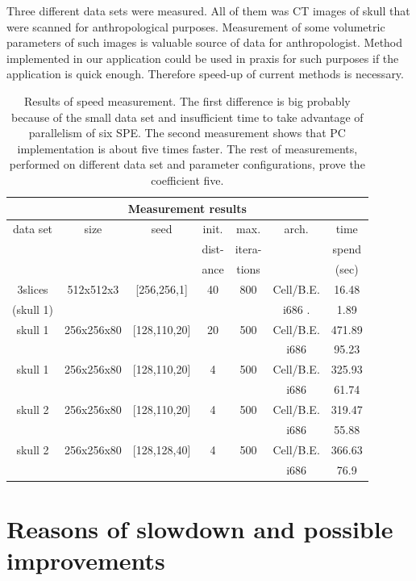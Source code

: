 Three different data sets were measured.
All of them was CT images of skull that were scanned for anthropological purposes.
Measurement of some volumetric parameters of such images is valuable source of data for anthropologist.
Method implemented in our application could be used in praxis for such purposes if the application is quick enough.
Therefore speed-up of current methods is necessary.

\begin{table}
\centering
\begin{tabular}{|c|c|c|c|c|c|c|}
\hline
\multicolumn{7}{|c|}{Measurement results}\\
\hline
data set		&size		&seed		&init.		&max. 		&arch.		&time\\
			&		&		&dist-		&itera-		&		&spend\\
			&		&		&ance		&tions		&		&(sec)\\
\hline
\hline
3slices 		&512x512x3	&[256,256,1]	&40		&800		&Cell/B.E.	&16.48\\
(skull 1)		&		&		&		&		&i686	.	&1.89\\
\hline
\hline
skull 1			&256x256x80	&[128,110,20]	&20		&500		&Cell/B.E.	&471.89\\
			&		&		&		&		&i686		&95.23\\
\hline
\hline
skull 1			&256x256x80	&[128,110,20]	&4		&500		&Cell/B.E.	&325.93\\
			&		&		&		&		&i686		&61.74\\
\hline
\hline
skull 2			&256x256x80	&[128,110,20]	&4		&500		&Cell/B.E.	&319.47\\
			&		&		&		&		&i686		&55.88\\
\hline
\hline
skull 2			&256x256x80	&[128,128,40]	&4		&500		&Cell/B.E.	&366.63\\
			&		&		&		&		&i686		&76.9\\
\hline
\end{tabular}
\par
\caption[Measurement results]
{
Results of speed measurement.
The first difference is big probably because of the small data set and insufficient time to take advantage of parallelism of six SPE.
The second measurement shows that PC implementation is about five times faster.
The rest of measurements, performed on different data set and parameter configurations, prove the coefficient five.
}
\label{tab:runresults}
\end{table}

\section{Reasons of slowdown and possible improvements}

